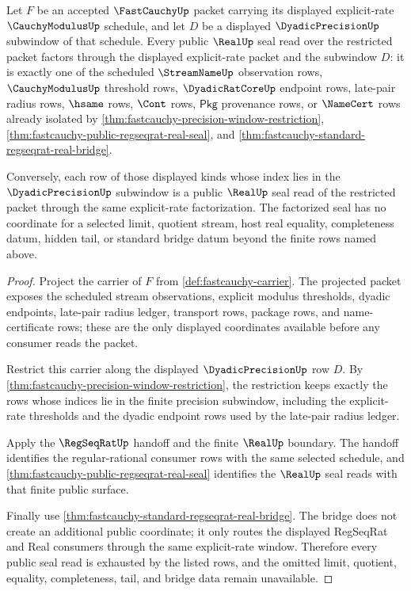 \begin{theorem}
\label{thm:fastcauchy-explicit-rate-seal-window-exhaustion}
Let $F$ be an accepted $\FastCauchyUp$ packet carrying its displayed
explicit-rate $\CauchyModulusUp$ schedule, and let $D$ be a displayed
$\DyadicPrecisionUp$ subwindow of that schedule. Every public $\RealUp$ seal
read over the restricted packet factors through the displayed explicit-rate
packet and the subwindow $D$: it is exactly one of the scheduled
$\StreamNameUp$ observation rows, $\CauchyModulusUp$ threshold rows,
$\DyadicRatCoreUp$ endpoint rows, late-pair radius rows, $\hsame$ rows,
$\Cont$ rows, $\mathsf{Pkg}$ provenance rows, or $\NameCert$ rows already
isolated by \autoref{thm:fastcauchy-precision-window-restriction},
\autoref{thm:fastcauchy-public-regseqrat-real-seal}, and
\autoref{thm:fastcauchy-standard-regseqrat-real-bridge}.

Conversely, each row of those displayed kinds whose index lies in the
$\DyadicPrecisionUp$ subwindow is a public $\RealUp$ seal read of the
restricted packet through the same explicit-rate factorization. The factorized
seal has no coordinate for a selected limit, quotient stream, host real
equality, completeness datum, hidden tail, or standard bridge datum beyond the
finite rows named above.
\end{theorem}
\begin{proof}
Project the carrier of $F$ from \autoref{def:fastcauchy-carrier}. The projected
packet exposes the scheduled stream observations, explicit modulus thresholds,
dyadic endpoints, late-pair radius ledger, transport rows, package rows, and
name-certificate rows; these are the only displayed coordinates available
before any consumer reads the packet.

Restrict this carrier along the displayed $\DyadicPrecisionUp$ row $D$. By
\autoref{thm:fastcauchy-precision-window-restriction}, the restriction keeps
exactly the rows whose indices lie in the finite precision subwindow, including
the explicit-rate thresholds and the dyadic endpoint rows used by the late-pair
radius ledger.

Apply the $\RegSeqRatUp$ handoff and the finite $\RealUp$ boundary. The handoff
identifies the regular-rational consumer rows with the same selected schedule,
and \autoref{thm:fastcauchy-public-regseqrat-real-seal} identifies the
$\RealUp$ seal reads with that finite public surface.

Finally use \autoref{thm:fastcauchy-standard-regseqrat-real-bridge}. The bridge
does not create an additional public coordinate; it only routes the displayed
RegSeqRat and Real consumers through the same explicit-rate window. Therefore
every public seal read is exhausted by the listed rows, and the omitted limit,
quotient, equality, completeness, tail, and bridge data remain unavailable.
\end{proof}

